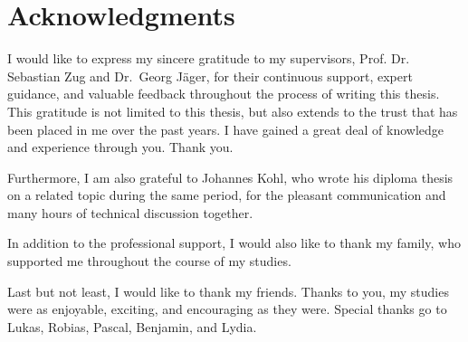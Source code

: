\chapter*{Acknowledgments} \label{chap:acknowledgments} 
\thispagestyle{empty}
I would like to express my sincere gratitude to my supervisors, Prof. Dr. Sebastian Zug and Dr.~Georg Jäger, for their continuous support, expert guidance, and valuable feedback throughout the process of writing this thesis. This gratitude is not limited to this thesis, but also extends to the trust that has been placed in me over the past years. I have gained a great deal of knowledge and experience through you. Thank you.

Furthermore, I am also grateful to Johannes Kohl, who wrote his diploma thesis on a related topic during the same period, for the pleasant communication and many hours of technical discussion together.

In addition to the professional support, I would also like to thank my family, who supported me throughout the course of my studies.

Last but not least, I would like to thank my friends. Thanks to you, my studies were as enjoyable, exciting, and encouraging as they were. Special thanks go to Lukas, Robias, Pascal, Benjamin, and Lydia.